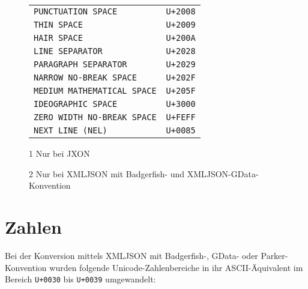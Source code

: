 \begin{figure}[h!]
\begin{center}
\begin{threeparttable}
\begin{tabular}{lr}
                                 \texttt{PUNCTUATION SPACE}                  & \texttt{U+2008}\\
            \rowcolor{rubgray!50}\texttt{THIN SPACE}                         & \texttt{U+2009}\\
                                 \texttt{HAIR SPACE}                         & \texttt{U+200A}\\
            \rowcolor{rubgray!50}\texttt{LINE SEPARATOR}                     & \texttt{U+2028}\\
                                 \texttt{PARAGRAPH SEPARATOR}                & \texttt{U+2029}\\
            \rowcolor{rubgray!50}\texttt{NARROW NO-BREAK SPACE}              & \texttt{U+202F}\\
                                 \texttt{MEDIUM MATHEMATICAL SPACE}          & \texttt{U+205F}\\
            \rowcolor{rubgray!50}\texttt{IDEOGRAPHIC SPACE}                  & \texttt{U+3000}\\
                                 \texttt{ZERO WIDTH NO-BREAK SPACE}\tnote{1} & \texttt{U+FEFF}\\
            \rowcolor{rubgray!50}\texttt{NEXT LINE (NEL)}\tnote{2}           & \texttt{U+0085}\\
            \bottomrule
            \end{tabular}
            \begin{tablenotes}
                \item[1] Nur bei JXON
                \item[2] Nur bei XMLJSON mit Badgerfish- und XMLJSON-GData-Konvention
            \end{tablenotes}
        \end{threeparttable}
        \endgroup
    \end{center}
\end{figure}

\newpage{}
\section{Zahlen}
\label{appx:unicode-digits}

Bei der Konversion mittels XMLJSON mit Badgerfish-, GData- oder Parker-Konvention wurden folgende Unicode-Zahlenbereiche in ihr ASCII-Äquivalent im Bereich \texttt{U+0030} bis \texttt{U+0039} umgewandelt:

